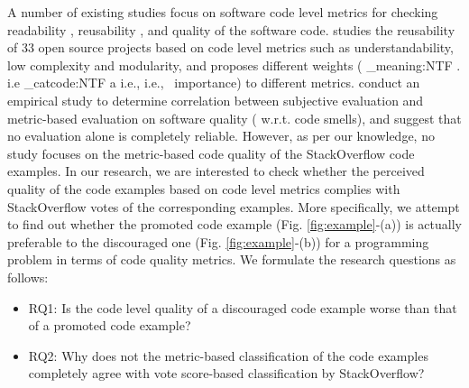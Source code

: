 \documentclass{sig-alternate}
\makeatletter
\newcommand\latinabbrev[1]{
  \peek_meaning:NTF . {%
    #1\@}%
  { \peek_catcode:NTF a {%
      #1., \@ }%
    {#1., \@}}}
\def\ie{\latinabbrev{i.e}}
\makeatother
\begin{document}
A number of existing studies focus on software code level metrics for checking readability \cite{readability}, reusability \cite{reusability}, and quality \cite{lochmann, survey} of the software code. \citet{reusability} studies the reusability of 33 open source projects based on code level metrics such as understandability, low complexity and modularity, and proposes different weights (\ie\ importance) to different metrics. \citet{subjective} conduct an empirical study to determine correlation between subjective evaluation and metric-based evaluation on software quality ( w.r.t. code smells), and suggest that no evaluation alone is completely reliable. However, as per our knowledge, no study focuses on the metric-based code quality of the StackOverflow code examples. In our research, we are interested to check whether the perceived quality of the code examples based on code level metrics complies with StackOverflow votes of the corresponding examples. More specifically, we attempt to find out whether the promoted code example (Fig. \ref{fig:example}-(a)) is actually preferable to the discouraged one (Fig. \ref{fig:example}-(b)) for a programming problem in terms of code quality metrics. We formulate the research questions as follows:
\vspace{-.15cm}
\begin{itemize}
\setlength{\topsep}{0pt}
\item RQ1: Is the code level quality of a discouraged code example worse than that of a promoted code example?
\item RQ2: Why does not the metric-based classification of the code examples completely agree with vote score-based classification by StackOverflow?
\end{itemize}
\end{document}
